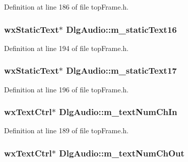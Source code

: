 Definition at line 186 of file top\-Frame.\-h.

\hypertarget{class_dlg_audio_a90f47825bd359dfde13a0f2e6aa34e69}{
\subsubsection[{m\-\_\-static\-Text16}]{\setlength{\rightskip}{0pt plus 5cm}wx\-Static\-Text$\ast$ Dlg\-Audio\-::m\-\_\-static\-Text16\hspace{0.3cm}{\ttfamily [protected]}}}\label{class_dlg_audio_a90f47825bd359dfde13a0f2e6aa34e69}


Definition at line 194 of file top\-Frame.\-h.

\hypertarget{class_dlg_audio_aab6e9f04d01aff925f76195da96471fc}{
\subsubsection[{m\-\_\-static\-Text17}]{\setlength{\rightskip}{0pt plus 5cm}wx\-Static\-Text$\ast$ Dlg\-Audio\-::m\-\_\-static\-Text17\hspace{0.3cm}{\ttfamily [protected]}}}\label{class_dlg_audio_aab6e9f04d01aff925f76195da96471fc}


Definition at line 196 of file top\-Frame.\-h.

\hypertarget{class_dlg_audio_a0d5cd2fc25435939bf8ca2dc2c4fa9b7}{
\subsubsection[{m\-\_\-text\-Num\-Ch\-In}]{\setlength{\rightskip}{0pt plus 5cm}wx\-Text\-Ctrl$\ast$ Dlg\-Audio\-::m\-\_\-text\-Num\-Ch\-In\hspace{0.3cm}{\ttfamily [protected]}}}\label{class_dlg_audio_a0d5cd2fc25435939bf8ca2dc2c4fa9b7}


Definition at line 189 of file top\-Frame.\-h.

\hypertarget{class_dlg_audio_a35f852fc3c494b83ceb14d2d5c1ad6db}{
\subsubsection[{m\-\_\-text\-Num\-Ch\-Out}]{\setlength{\rightskip}{0pt plus 5cm}wx\-Text\-Ctrl$\ast$ Dlg\-Audio\-::m\-\_\-text\-Num\-Ch\-Out\hspace{0.3cm}{\ttfamily [protected]}}}\label{class_dlg_audio_a35f852fc3c494b83ceb14d2d5c1ad6db}



